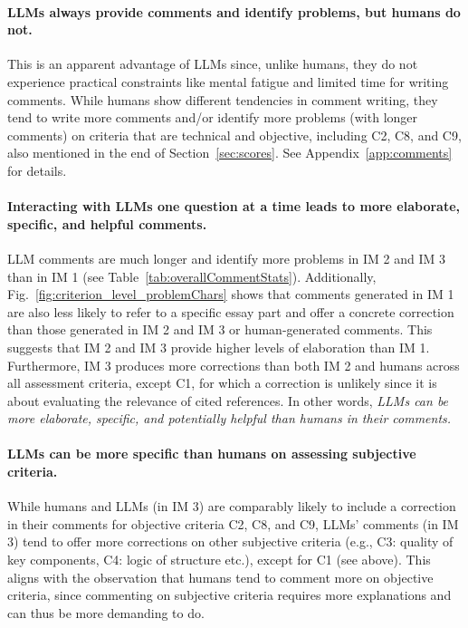 \paragraph{LLMs always provide comments and identify problems, but humans do not.} This is an apparent advantage of LLMs since, unlike humans, they do not experience practical constraints like mental fatigue and limited time for writing comments. While humans show different tendencies in comment writing, they tend to write more comments and/or identify more problems (with longer comments) on criteria that are technical and objective, including C2, C8, and C9, also mentioned in the end of Section~\ref{sec:scores}. See Appendix~\ref{app:comments} for details.


\paragraph{Interacting with LLMs one question at a time leads to more elaborate, specific, and helpful comments.} LLM comments are much longer and identify more problems in IM 2 and IM 3 than in IM 1 (see Table~\ref{tab:overallCommentStats}). Additionally, Fig.~\ref{fig:criterion_level_problemChars} shows that comments generated in IM 1 are also less likely to refer to a specific essay part and offer a concrete correction than those generated in IM 2 and IM 3 or human-generated comments. This suggests that IM 2 and IM 3 provide higher levels of elaboration than IM 1. Furthermore, IM 3 produces more corrections than both IM 2 and humans across all assessment criteria, except C1, for which a correction is unlikely since it is about evaluating the relevance of cited references. In other words, \textit{LLMs can be more elaborate, specific, and potentially helpful than humans in their comments.}


\paragraph{LLMs can be  more specific than humans on assessing subjective criteria.} While humans and LLMs (in IM 3) are comparably likely to include a correction in their comments for objective criteria C2, C8, and C9, LLMs' comments (in IM 3) tend to offer more corrections on other subjective criteria (e.g., C3: quality of key components, C4: logic of structure etc.), except for C1 (see above). This aligns with the observation that humans tend to comment more on objective criteria, since commenting on subjective criteria requires more explanations and can thus be more demanding to do. 



